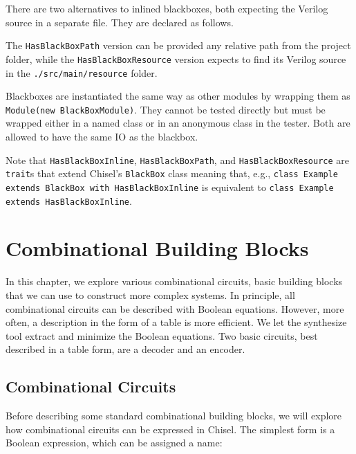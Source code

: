 \documentclass[%
    10pt,
    headinclude, footexclude,
    openright, %
    notitlepage,
    cleardoubleempty,
    headsepline,
    pointlessnumbers,
    bibtotoc, idxtotoc,
    ]{scrbook}
\newcommand{\code}[1]{{\small{\texttt{#1}}}}
\begin{document}
There are two alternatives to inlined blackboxes, both expecting the Verilog source in 
a separate file. They are declared as follows.

The \code{HasBlackBoxPath} version can be provided any relative path from the project 
folder, while the \code{HasBlackBoxResource} version expects to find its Verilog source 
in the \code{./src/main/resource} folder.

Blackboxes are instantiated the same way as other modules by wrapping them as 
\code{Module(new BlackBoxModule)}. They cannot be tested directly but must be wrapped 
either in a named class or in an anonymous class in the tester. Both are allowed to have 
the same IO as the blackbox.

Note that \code{HasBlackBoxInline}, \code{HasBlackBoxPath}, and \code{HasBlackBoxResource} 
are \code{trait}s that extend Chisel's \code{BlackBox} class meaning that, e.g., 
\code{class Example extends BlackBox with HasBlackBoxInline} is equivalent to 
\code{class Example extends HasBlackBoxInline}.

\chapter{Combinational Building Blocks}

In this chapter, we explore various combinational circuits, basic building blocks that we can
use to construct more complex systems.
In principle, all combinational circuits can be described with Boolean equations.
However, more often, a description in the form of a table is more efficient.
We let the synthesize tool extract and minimize the Boolean equations.
Two basic circuits, best described in a table form, are a decoder and an encoder.

\section{Combinational Circuits}


Before describing some standard combinational building blocks, we will explore
how combinational circuits can be expressed in Chisel.
The simplest form is a Boolean expression, which can be assigned a name:

\end{document}
